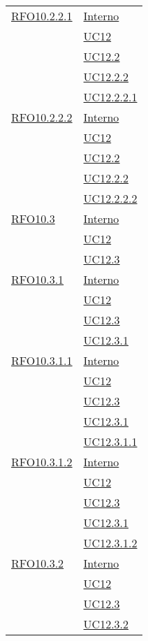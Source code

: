 \begin{longtable}{|>{\centering}m{5cm}|m{5cm}<{\centering}|}
 \hyperlink{RFO10.2.2.1}{RFO10.2.2.1} 
 & \hyperlink{Interno}{Interno}\\
& \hyperref[UC12]{UC12}\\
& \hyperref[UC12.2]{UC12.2}\\
& \hyperref[UC12.2.2]{UC12.2.2}\\
& \hyperref[UC12.2.2.1]{UC12.2.2.1}\\\hline

 \hyperlink{RFO10.2.2.2}{RFO10.2.2.2} 
 & \hyperlink{Interno}{Interno}\\
& \hyperref[UC12]{UC12}\\
& \hyperref[UC12.2]{UC12.2}\\
& \hyperref[UC12.2.2]{UC12.2.2}\\
& \hyperref[UC12.2.2.2]{UC12.2.2.2}\\\hline

 \hyperlink{RFO10.3}{RFO10.3} 
& \hyperlink{Interno}{Interno}\\
& \hyperref[UC12]{UC12}\\
& \hyperref[UC12.3]{UC12.3}\\\hline

 \hyperlink{RFO10.3.1}{RFO10.3.1} 
& \hyperlink{Interno}{Interno}\\
& \hyperref[UC12]{UC12}\\
& \hyperref[UC12.3]{UC12.3}\\
& \hyperref[UC12.3.1]{UC12.3.1}\\\hline

 \hyperlink{RFO10.3.1.1}{RFO10.3.1.1} 
& \hyperlink{Interno}{Interno}\\
& \hyperref[UC12]{UC12}\\
& \hyperref[UC12.3]{UC12.3}\\
& \hyperref[UC12.3.1]{UC12.3.1}\\
& \hyperref[UC12.3.1.1]{UC12.3.1.1}\\\hline

 \hyperlink{RFO10.3.1.2}{RFO10.3.1.2} 
& \hyperlink{Interno}{Interno}\\
& \hyperref[UC12]{UC12}\\
& \hyperref[UC12.3]{UC12.3}\\
& \hyperref[UC12.3.1]{UC12.3.1}\\
& \hyperref[UC12.3.1.2]{UC12.3.1.2}\\\hline

 \hyperlink{RFO10.3.2}{RFO10.3.2} 
& \hyperlink{Interno}{Interno}\\
& \hyperref[UC12]{UC12}\\
& \hyperref[UC12.3]{UC12.3}\\
& \hyperref[UC12.3.2]{UC12.3.2}\\\hline


\end{longtable}

